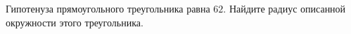 \begin{ex}
	\begin{condition}
		Гипотенуза прямоугольного треугольника равна \( 62 \). Найдите радиус описанной окружности этого треугольника.
	\end{condition}
\end{ex}